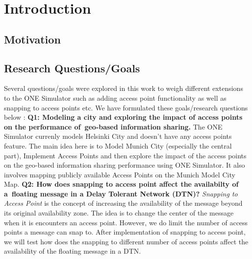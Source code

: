 
\chapter{Introduction}\label{chapter:introduction}

\section{Motivation}
\newpage
\section{Research Questions/Goals}
Several questions/goals were explored in this work to weigh different extensions to the ONE Simulator such as adding access point functionality as well as snapping to access points etc. We have formulated these goals/research questions below :\newline
\newline\textbf{Q1: Modeling a city and exploring the impact of access points on the performance of geo-based information sharing.}\newline
The ONE Simulator currenly models Helsinki City and doesn't have any access points feature. The main idea here is to Model Munich City (especially the central part), Implement Access Points and then explore the impact of the access points on the geo-based information sharing performance using ONE Simulator. It also involves mapping publicly available Access Points on the Munich Model City Map.\newline
\newline\textbf{Q2: How does snapping to access point affect the availabilty of a floating message in a Delay Tolerant Network (DTN)?}\newline
\textit{Snapping to Access Point} is the concept of increasing the availability of the message beyond its original availability zone. The idea is to change the center of the message when it is encounters an access point. However, we do limit the number of access points a message can snap to. After implementation of snapping to access point, we will test how does the snapping to different number of access points affect the availability of the floating message in a DTN.
